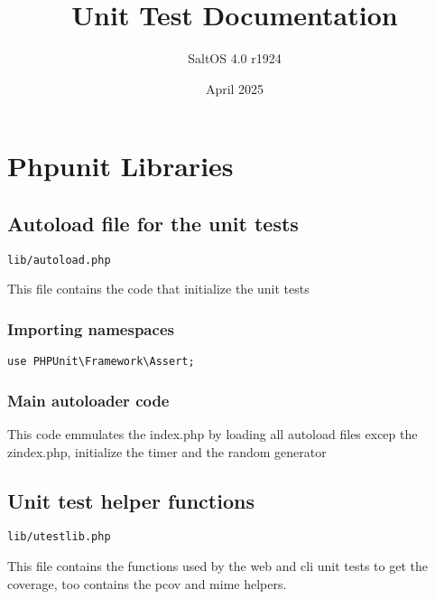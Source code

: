 \documentclass[a4paper]{article}
\title{Unit Test Documentation}
\author{SaltOS 4.0 r1924}
\begin{document}
\date{April 2025}
\maketitle
\clearpage

\tableofcontents
\clearpage


\hypertarget{toc1}{}
\section{Phpunit Libraries}

\hypertarget{toc2}{}
\subsection{Autoload file for the unit tests}

\begin{lstlisting}
lib/autoload.php
\end{lstlisting}

This file contains the code that initialize the unit tests

\hypertarget{toc3}{}
\subsubsection{Importing namespaces}

\begin{lstlisting}
use PHPUnit\Framework\Assert;
\end{lstlisting}

\hypertarget{toc4}{}
\subsubsection{Main autoloader code}

This code emmulates the index.php by loading all autoload files excep
the zindex.php, initialize the timer and the random generator

\hypertarget{toc5}{}
\subsection{Unit test helper functions}

\begin{lstlisting}
lib/utestlib.php
\end{lstlisting}

This file contains the functions used by the web and cli unit tests
to get the coverage, too contains the pcov and mime helpers.

\hypertarget{toc6}{}
\end{document}
